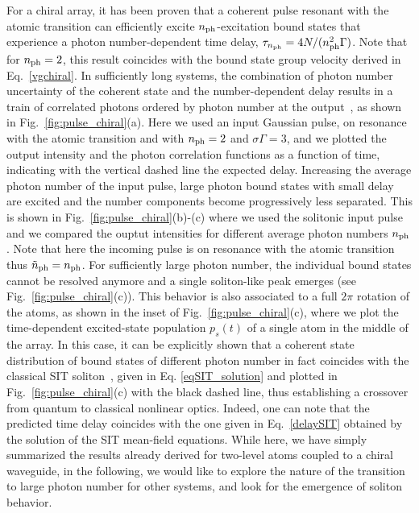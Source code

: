 \documentclass[pra,twocolumn,showpacs,preprintnumbers,amsmath,amssymb]{revtex4-1}
\begin{document}
For a chiral array, it has been proven that a coherent pulse resonant with the atomic transition can efficiently excite $n_{\rm ph}$-excitation bound states that experience a photon number-dependent time delay, $\tau_{n_{\rm ph}} = 4N/(n_{\rm ph}^2\Gamma)$. Note that for $n_{\rm ph}=2$, this result coincides with the bound state group velocity derived in Eq.~\eqref{vgchiral}. In sufficiently long systems, the combination of photon number uncertainty of the coherent state and the number-dependent delay results in a train of correlated photons ordered by photon number at the output~\cite{mahmo_calajo}, as shown in Fig.~\ref{fig:pulse_chiral}(a). Here we used an input Gaussian pulse, on resonance with the atomic transition and with $n_{\rm ph}=2$  and $\sigma\Gamma=3$, and we plotted   the output intensity and the photon correlation functions as a function of time, indicating with the vertical dashed line the expected delay.  Increasing the average photon number of the input pulse, large photon bound states with small delay are excited and the number components become progressively less separated. This is shown in Fig.~\ref{fig:pulse_chiral}(b)-(c) where we used the solitonic input pulse and we compared the ouptut intensities for different average photon numbers $n_{\rm ph}$. Note that here  the incoming pulse is on resonance with the atomic transition thus $\tilde n_{\rm ph}=n_{\rm ph}$. For sufficiently large photon number, the individual bound states cannot be resolved anymore and a single soliton-like peak emerges (see Fig.~\ref{fig:pulse_chiral}(c)). This behavior is also associated to a full $2\pi$ rotation of the atoms, as shown in the inset of Fig.~\ref{fig:pulse_chiral}(c), where we plot the  time-dependent excited-state population $p_s(t)$ of a single atom in the middle of the array.
In this case, it can be explicitly shown that a coherent state distribution of bound states of different photon number in fact coincides with the classical SIT soliton~\cite{McCall1,McCall2,Bullough,mahmo_calajo}, given in Eq. \eqref{eqSIT_solution} and plotted in Fig.~\ref{fig:pulse_chiral}(c) with the black dashed line, thus establishing a crossover from quantum to classical nonlinear optics. Indeed, one can note that the predicted time delay coincides with the one given in Eq.~\eqref{delaySIT} obtained by the solution of the SIT mean-field equations. 
While here, we have simply summarized the results already derived for two-level atoms coupled to a chiral waveguide, in the following, we would like to explore the nature of the transition to large photon number for other systems, and look for the emergence of soliton behavior.
\end{document}
